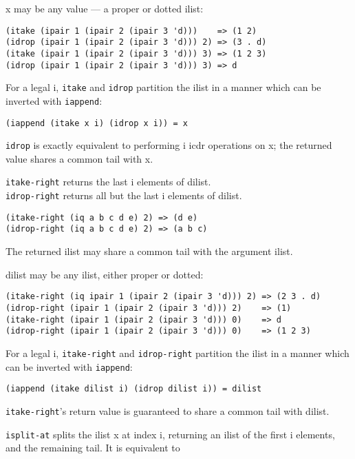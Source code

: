 \begin{description}
x may be any value --- a proper or dotted ilist:

\begin{verbatim}
(itake (ipair 1 (ipair 2 (ipair 3 'd)))    => (1 2)
(idrop (ipair 1 (ipair 2 (ipair 3 'd))) 2) => (3 . d)
(itake (ipair 1 (ipair 2 (ipair 3 'd))) 3) => (1 2 3)
(idrop (ipair 1 (ipair 2 (ipair 3 'd))) 3) => d
\end{verbatim}

For a legal i, \texttt{itake} and \texttt{idrop} partition the ilist in
a manner which can be inverted with \texttt{iappend}:

\begin{verbatim}
(iappend (itake x i) (idrop x i)) = x
\end{verbatim}

\texttt{idrop} is exactly equivalent to performing i icdr operations on
x; the returned value shares a common tail with x.
\item[ \href{}{} \texttt{itake-right} dilist i -\textgreater{} object\\
\href{}{} \texttt{idrop-right} dilist i -\textgreater{} ilist ]
\texttt{itake-right} returns the last i elements of dilist.\\
\texttt{idrop-right} returns all but the last i elements of dilist.

\begin{verbatim}
(itake-right (iq a b c d e) 2) => (d e)
(idrop-right (iq a b c d e) 2) => (a b c)
\end{verbatim}

The returned ilist may share a common tail with the argument ilist.

dilist may be any ilist, either proper or dotted:

\begin{verbatim}
(itake-right (iq ipair 1 (ipair 2 (ipair 3 'd))) 2) => (2 3 . d)
(idrop-right (ipair 1 (ipair 2 (ipair 3 'd))) 2)    => (1)
(itake-right (ipair 1 (ipair 2 (ipair 3 'd))) 0)    => d
(idrop-right (ipair 1 (ipair 2 (ipair 3 'd))) 0)    => (1 2 3)
\end{verbatim}

For a legal i, \texttt{itake-right} and \texttt{idrop-right} partition
the ilist in a manner which can be inverted with \texttt{iappend}:

\begin{verbatim}
(iappend (itake dilist i) (idrop dilist i)) = dilist
\end{verbatim}

\texttt{itake-right}'s return value is guaranteed to share a common tail
with dilist.
\item[ \href{}{} \texttt{isplit-at~} x i -\textgreater{} {[}ilist
object{]} ]
\texttt{isplit-at} splits the ilist x at index i, returning an ilist of
the first i elements, and the remaining tail. It is equivalent to


\end{description}

